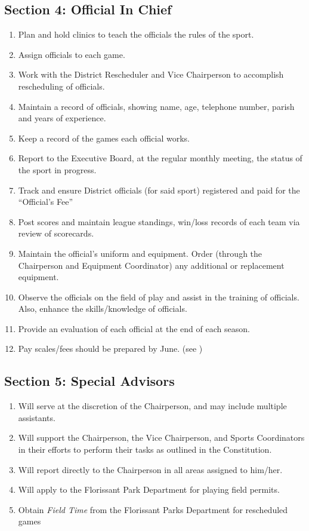\subsection{Section 4: Official In Chief}
\label{ssec:rules-g-4}
\begin{enumerate}[1.]
    \item Plan and hold clinics to teach the officials the rules of the sport.
    \item Assign officials to each game.
    \item Work with the District Rescheduler and Vice Chairperson to accomplish rescheduling of officials.
    \item Maintain a record of officials, showing name, age, telephone number, parish and years of experience.
    \item Keep a record of the games each official works.
    \item Report to the Executive Board, at the regular monthly meeting, the status of the sport in progress.
    \item Track and ensure District officials (for said sport) registered and paid for the “Official’s Fee”
    \item Post scores and maintain league standings, win/loss records of each team via review of scorecards.
    \item Maintain the official's uniform and equipment.  Order (through the Chairperson and Equipment Coordinator) any additional or replacement equipment.
    \item Observe the officials on the field of play and assist in the training of officials.  Also, enhance the skills/knowledge of officials.
    \item Provide an evaluation of each official at the end of each season.
    \item Pay scales/fees should be prepared by June. (see )
\end{enumerate}

\subsection{Section 5: Special Advisors}
\label{ssec:rules-g-5}
\begin{enumerate}[1.]
    \item Will serve at the discretion of the Chairperson, and may include multiple assistants.
    \item Will support the Chairperson, the Vice Chairperson, and Sports Coordinators in their efforts to perform their tasks as outlined in the Constitution.
    \item Will report directly to the Chairperson in all areas assigned to him/her.
    \item Will apply to the Florissant Park Department for playing field permits.
    \item Obtain {\em Field Time} from the Florissant Parks Department for rescheduled games
\end{enumerate}

